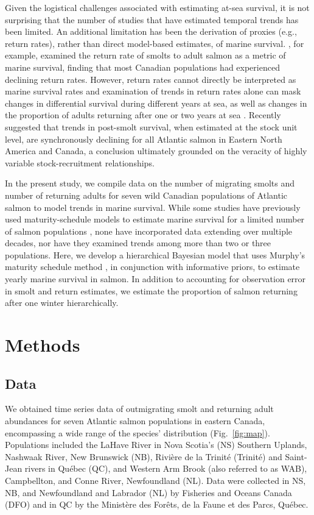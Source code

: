\documentclass[12pt]{article}
\begin{document}
Given the logistical challenges associated with estimating at-sea survival, it
is not surprising that the number of studies that have estimated temporal
trends has been limited. An additional limitation has been the derivation of
proxies (e.g., return rates), rather than direct model-based estimates, of
marine survival.
\citet{Chaput2012a}, for example, examined the return rate of smolts to adult salmon 
as a metric of marine survival, finding that most Canadian populations 
had experienced declining return rates. 
However, return rates cannot directly be interpreted as marine survival rates and 
examination of trends in return rates alone can mask changes in
differential survival during different years at sea, as well as changes in the
proportion of adults returning after one or two years at sea \citep{Hubley2011}.
Recently \citet{Olmos2019} suggested that trends in post-smolt
survival, when estimated at the stock unit level, are synchronously declining
for all Atlantic salmon in Eastern North America and Canada, a conclusion ultimately 
grounded on the veracity of highly variable stock-recruitment relationships.

In the present study, we compile data on the number of migrating smolts and number of returning adults 
for seven wild Canadian populations of Atlantic salmon to model trends in marine survival.
While some studies have previously used maturity-schedule models to estimate marine
survival for a limited number of salmon populations \citep{Chaput2003b,Hubley2011}, none
have incorporated data extending over multiple decades, nor have they examined
trends among more than two or three populations. 
Here, we develop a hierarchical Bayesian model that uses Murphy's maturity
schedule method \citep{Murphy1952}, in conjunction with informative priors, to estimate yearly
marine survival in salmon. In addition to accounting for observation error in
smolt and return estimates, we estimate the proportion of salmon returning
after one winter hierarchically.

\section*{Methods}

\subsection*{Data}

We obtained time series data of outmigrating smolt and returning adult
abundances for seven Atlantic salmon populations in eastern Canada, encompassing a
wide range of the species' distribution (Fig.~\ref{fig:map}). 
Populations included the LaHave River in Nova Scotia's (NS) Southern Uplands, 
Nashwaak River, New Brunswick (NB), Rivi\`{e}re de la Trinit\'{e} (Trinit\'{e}) and
Saint-Jean rivers in Qu\'{e}bec (QC), and  Western Arm Brook (also referred to as  WAB), 
Campbellton, and Conne River, Newfoundland (NL). 
Data were collected in NS, NB, and Newfoundland
and Labrador (NL) by Fisheries and Oceans Canada (DFO) and in QC
by the Minist\`{e}re des For\^{e}ts, de la Faune et des Parcs, Qu\'{e}bec.
\end{document}
